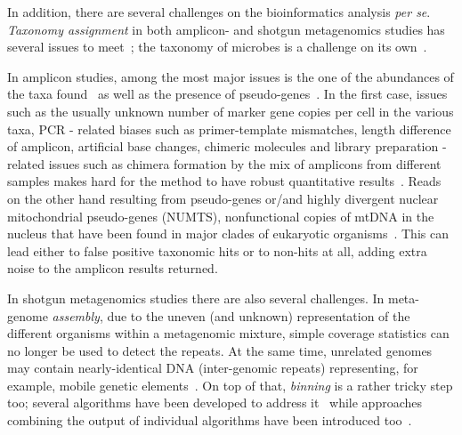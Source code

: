       In addition, there are several challenges on the bioinformatics analysis \textit{per se}.
      \textit{Taxonomy assignment} in both amplicon- and shotgun metagenomics studies 
      has several issues to meet~\citep{simon2019benchmarking};
      the taxonomy of microbes is a challenge on its own~\citep{parks2020complete}.

      In amplicon studies, among the most major issues is the one of the abundances of the
      taxa found~\citep{fonseca2018pitfalls, balint2016millions} as well as the presence of pseudo-genes~\citep{song2008many}.
      In the first case, 
      issues such as  
      the usually unknown number of marker gene copies per cell in the various taxa,
      PCR - related biases such as primer-template mismatches, length difference of amplicon, artificial base changes, chimeric molecules 
      and library preparation - related issues such as chimera formation by the mix of amplicons from different samples
      makes hard for the method to have robust quantitative results~\citep{balint2016millions}. 
      Reads on the other hand resulting from pseudo-genes or/and highly divergent nuclear mitochondrial pseudo-genes (NUMTS), nonfunctional copies of mtDNA in the nucleus that have been found in major clades of eukaryotic organisms~\citep{bensasson2001mitochondrial}. 
      This can lead either to false positive taxonomic hits or to non-hits at all,
      adding extra noise to the amplicon results returned.

      In shotgun metagenomics studies there are also several challenges. 
      In meta-genome \textit{assembly},
      due to the uneven (and unknown) representation of the different organisms within a metagenomic mixture, 
      simple coverage statistics can no longer be used to detect the repeats. 
      At the same time, unrelated genomes may contain
      nearly-identical DNA (inter-genomic repeats) representing, for example, mobile genetic elements~\citep{ghurye2016focus}.
      On top of that, \textit{binning} is a rather tricky step too; 
      several algorithms have been developed to address it~\citep{yue2020evaluating}
      while approaches combining the output of individual algorithms have been introduced too~\citep{song2017binning_refiner}.


